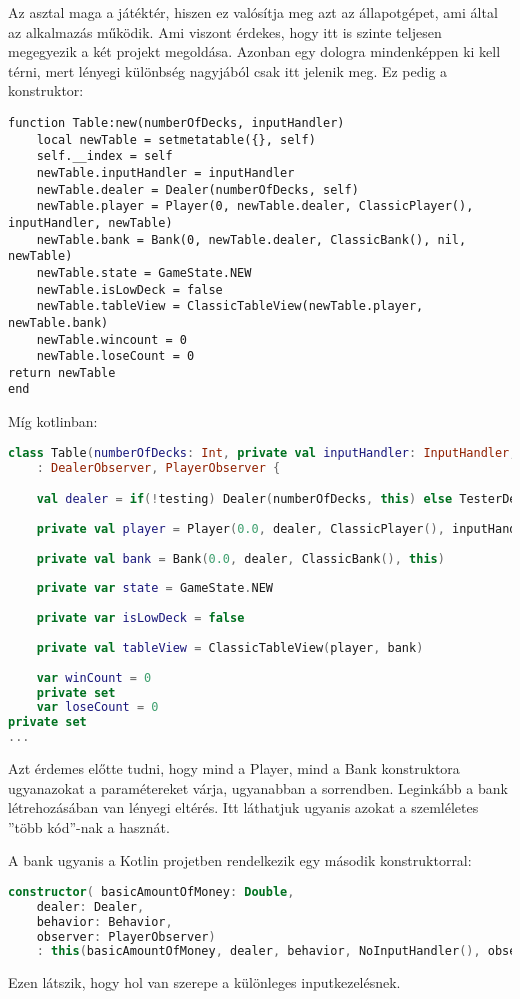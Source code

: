 Az asztal maga a játéktér, hiszen ez valósítja meg azt az állapotgépet, ami által az alkalmazás működik. Ami viszont érdekes, hogy itt is szinte teljesen megegyezik a két projekt megoldása. Azonban egy dologra mindenképpen ki kell térni, mert lényegi különbség nagyjából csak itt jelenik meg. Ez pedig a konstruktor:
\scriptsize
\begin{lstlisting}[style=Lua]
function Table:new(numberOfDecks, inputHandler)
	local newTable = setmetatable({}, self)
	self.__index = self
	newTable.inputHandler = inputHandler
	newTable.dealer = Dealer(numberOfDecks, self)
	newTable.player = Player(0, newTable.dealer, ClassicPlayer(), inputHandler, newTable)
	newTable.bank = Bank(0, newTable.dealer, ClassicBank(), nil, newTable)
	newTable.state = GameState.NEW
	newTable.isLowDeck = false
	newTable.tableView = ClassicTableView(newTable.player, newTable.bank)
	newTable.wincount = 0
	newTable.loseCount = 0
return newTable
end
\end{lstlisting}
\normalsize
Míg kotlinban:
\scriptsize
\begin{lstlisting}[language = Kotlin]
class Table(numberOfDecks: Int, private val inputHandler: InputHandler, testing: Boolean = false) 
	: DealerObserver, PlayerObserver {

	val dealer = if(!testing) Dealer(numberOfDecks, this) else TesterDealer(numberOfDecks, this)
	
	private val player = Player(0.0, dealer, ClassicPlayer(), inputHandler, this)
	
	private val bank = Bank(0.0, dealer, ClassicBank(), this)
	
	private var state = GameState.NEW
	
	private var isLowDeck = false
	
	private val tableView = ClassicTableView(player, bank)
	
	var winCount = 0
	private set
	var loseCount = 0
private set
...
\end{lstlisting}
\normalsize
Azt érdemes előtte tudni, hogy mind a Player, mind a Bank konstruktora ugyanazokat a paramétereket várja, ugyanabban a sorrendben. Leginkább a bank létrehozásában van lényegi eltérés. Itt láthatjuk ugyanis azokat a szemléletes ''több kód''-nak a hasznát. 

\newpage

A bank ugyanis a Kotlin projetben rendelkezik egy második konstruktorral: 
\scriptsize
\begin{lstlisting}[language = Kotlin]
constructor( basicAmountOfMoney: Double,
	dealer: Dealer,
	behavior: Behavior,
	observer: PlayerObserver)
	: this(basicAmountOfMoney, dealer, behavior, NoInputHandler(), observer)
\end{lstlisting}
\normalsize
Ezen látszik, hogy hol van szerepe a különleges inputkezelésnek. 

